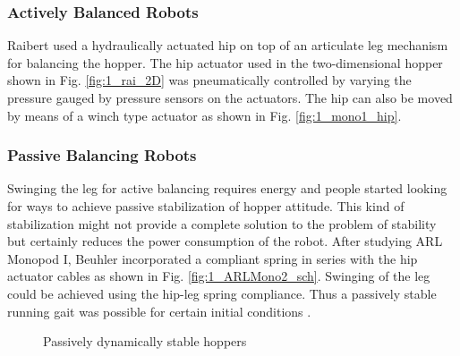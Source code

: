 \subsubsection{Actively Balanced Robots}
Raibert used a hydraulically actuated hip on top of an articulate leg mechanism for balancing the hopper. The hip actuator used in
the two-dimensional hopper shown in Fig. \ref{fig:1_rai_2D} was pneumatically controlled by varying the pressure gauged by pressure 
sensors on the actuators. The hip can also be moved by means of a winch type actuator as shown in Fig. \ref{fig:1_mono1_hip}. 

\subsubsection{Passive Balancing Robots}
Swinging the leg for active balancing requires energy and people started looking for ways to achieve passive stabilization of
hopper attitude. This kind of stabilization might not provide a complete solution to the problem of stability but certainly reduces
the power consumption of the robot.
After studying ARL Monopod I,  Beuhler incorporated a compliant spring in series with the hip actuator cables as shown in Fig. \ref{fig:1_ARLMono2_sch}. Swinging of the leg could be achieved using the hip-leg spring compliance. Thus a passively stable
running gait was possible for certain initial conditions \cite{Bue_PassRun, ARLMono2}.\\
\begin{figure}[h]
  \centering
  \hspace{0.05\textwidth}
  \caption[Passively dynamically stable hoppers]{Passively dynamically stable hoppers}
\end{figure}

